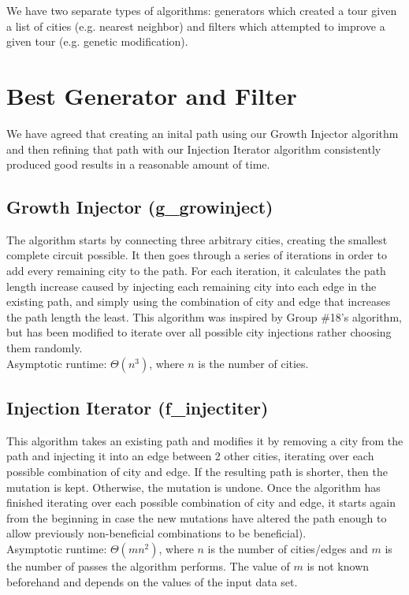 \documentclass{article}
\begin{document}
We have two separate types of algorithms: generators which created a tour given
a list of cities (e.g. nearest neighbor) and filters which attempted to improve
a given tour (e.g. genetic modification).

\section*{Best Generator and Filter}

We have agreed that creating an inital path using our Growth Injector algorithm
and then refining that path with our Injection Iterator algorithm consistently
produced good results in a reasonable amount of time.

\subsection*{Growth Injector (g\_growinject)}

The algorithm starts by connecting three arbitrary cities, creating the
smallest complete circuit possible. It then goes through a series of iterations
in order to add every remaining city to the path. For each iteration, it
calculates the path length increase caused by injecting each remaining city
into each edge in the existing path, and simply using the combination of city
and edge that increases the path length the least. This algorithm was inspired
by Group \#18's algorithm, but has been modified to iterate over all possible
city injections rather choosing them randomly.\\Asymptotic runtime: $\Theta
(n^3)$, where $n$ is the number of cities.

\subsection*{Injection Iterator (f\_injectiter)}

This algorithm takes an existing path and modifies it by removing a city from
the path and injecting it into an edge between 2 other cities, iterating over
each possible combination of city and edge. If the resulting path is shorter,
then the mutation is kept. Otherwise, the mutation is undone. Once the
algorithm has finished iterating over each possible combination of city and
edge, it starts again from the beginning in case the new mutations have altered
the path enough to allow previously non-beneficial combinations to be
beneficial).\\Asymptotic runtime: $\Theta (mn^2)$, where $n$ is the number of
cities/edges and $m$ is the number of passes the algorithm performs. The value
of $m$ is not known beforehand and depends on the values of the input data set.
\end{document}
